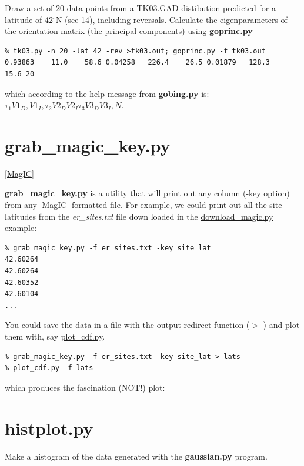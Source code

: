 \documentclass[11pt]{book}
\begin{document}
{{{Draw a set of 20 data points  from a TK03.GAD distibution predicted for a latitude of 42$^{\circ}$N (see  14), including reversals.  Calculate the eigenparameters of the orientation matrix (the principal components)  using {\bf goprinc.py} 

\begin{verbatim}
% tk03.py -n 20 -lat 42 -rev >tk03.out; goprinc.py -f tk03.out
0.93863    11.0    58.6 0.04258   226.4    26.5 0.01879   128.3    15.6 20
\end{verbatim}

\noindent  which according to the help message from {\bf gobing.py} is:    $\tau_1 V1_D, V1_I,  \tau_2 V2_D V2_I \tau_3 V3_D V3_I, N$.

\section{grab_magic_key.py}
\href{#MagIC}{[MagIC]}

{\bf grab\_magic\_key.py} is  a utility that will print out any column (-key option) from any \href{#MagIC}{[MagIC]} formatted file.  For example, we could print out all the site latitudes from the  {\it er\_sites.txt} file down loaded in the \href{#download_magic.py}{download\_magic.py} example:

\begin{verbatim}
% grab_magic_key.py -f er_sites.txt -key site_lat
42.60264
42.60264
42.60352
42.60104
...
\end{verbatim}

You could save the data in a file with the output redirect function ($>$ ) and plot them with, say \href{#plot_cdf.py}{plot\_cdf.py}.  

\begin{verbatim}
% grab_magic_key.py -f er_sites.txt -key site_lat > lats 
% plot_cdf.py -f lats
\end{verbatim}

which produces  the fascination (NOT!) plot:



\section {\bf histplot.py}

Make a histogram of the data generated with the {\bf gaussian.py} program.



}}}
\end{document}
